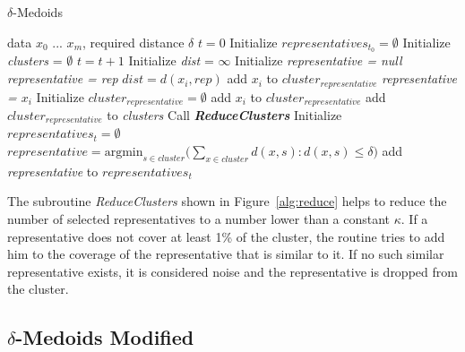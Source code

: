 \documentclass[thesis=B,english]{FITthesis}[2012/10/20]
\begin{document}
\begin{algorithm}
    \caption{$\delta$-Medoids}
    \label{alg:delta_medoids_full}
    \begin{algorithmic}[1]
        \INPUT data $x_0$ ... $x_m$, required distance $\delta$
        \STATE $t = 0$
        \STATE Initialize $representatives_{t_0} = \emptyset$
        \STATE Initialize \textit{clusters} = $\emptyset$
        \DO
            \STATE $t = t + 1$
                \STATE Initialize \textit{dist} = $\infty$
                \STATE Initialize \textit{representative = null}
                        \STATE \textit{representative = rep}
                        \STATE $dist = d(x_i, rep)$
                    \ENDIF
                \ENDFOR
                    \STATE add $x_i$ to $cluster_{representative}$
                \ELSE
                    \STATE \textit{representative = $x_i$}
                    \STATE Initialize $cluster_{representative} = \emptyset$
                    \STATE add $x_i$ to $cluster_{representative}$
                    \STATE add $cluster_{representative}$ to \textit{clusters}
                \ENDIF
            \ENDFOR
            \STATE Call \textbf{\textit{ReduceClusters}}
            \STATE Initialize $representatives_t = \emptyset$
                \STATE $representative = \textrm{argmin}_{s \in cluster} (\sum\limits_{x \in cluster}{d(x,s) : d(x,s) \le \delta)}$
                \STATE add \textit{representative} to $representatives_t$
            \ENDFOR
    \end{algorithmic}
\end{algorithm}

The subroutine \textit{ReduceClusters} shown in Figure~\ref{alg:reduce} helps to reduce the number of selected representatives to a number lower than a constant $\kappa$.
If a representative does not cover at least 1\% of the cluster, the routine tries to add him to the coverage of the representative that is similar to it.
If no such similar representative exists, it is considered noise and the representative is dropped from the cluster.

\subsection{$\delta$-Medoids Modified}
\end{document}
